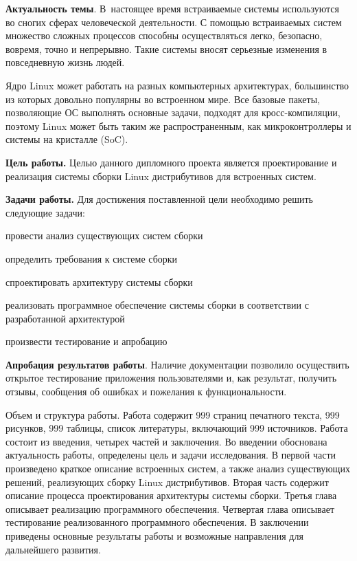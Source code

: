 
\textbf{Актуальность темы}. В~настоящее время встраиваемые системы используются во сногих сферах человеческой деятельности. С помощью встраиваемых систем множество сложных процессов способны осуществляться легко, безопасно, вовремя, точно и непрерывно. Такие системы вносят серьезные изменения в повседневную жизнь людей.

Ядро Linux может работать на разных компьютерных архитектурах, большинство из которых довольно популярны во встроенном мире. Все базовые пакеты, позволяющие ОС выполнять основные задачи, подходят для кросс-компиляции, поэтому Linux может быть таким же распространенным, как микроконтроллеры и системы на кристалле (SoC).

\textbf{Цель работы.} Целью данного дипломного проекта является проектирование и реализация системы сборки Linux дистрибутивов для встроенных систем.

\textbf{Задачи работы.} Для достижения поставленной цели необходимо решить следующие задачи:

\begin{dashitemize}
  \item провести анализ существующих систем сборки 
  \item определить требования к системе сборки 
  \item спроектировать архитектуру системы сборки 
  \item реализовать программное обеспечение системы сборки в соответствии с разработанной архитектурой 
  \item произвести тестирование и апробацию
\end{dashitemize}

\textbf{Апробация результатов работы}. Наличие документации позволило осуществить открытое тестирование приложения пользователями и, как результат, получить отзывы, сообщения об ошибках и пожелания к функциональности.


Объем и структура работы. 
Работа содержит 999 страниц печатного текста, 999 рисунков, 999 таблицы, список литературы, включающий 999 источников. 
Работа состоит из введения, четырех частей и заключения. 
Во введении обоснована актуальность работы, определены цель и задачи исследования. 
В первой части произведено краткое описание встроенных систем, а также анализ существующих решений, реализующих сборку Linux дистрибутивов. 
Вторая часть содержит описание процесса проектирования архитектуры системы сборки. 
Третья глава описывает реализацию программного обеспечения. 
Четвертая глава описывает тестирование реализованного программного обеспечения. 
В заключении приведены основные результаты работы и возможные направления для дальнейшего развития.
\newpage
